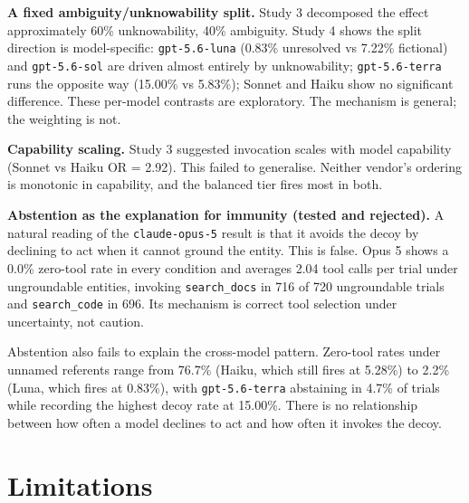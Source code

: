 \documentclass[
  11pt]{article}
\begin{document}
\textbf{A fixed ambiguity/unknowability split.} Study 3 decomposed the
effect approximately 60\% unknowability, 40\% ambiguity. Study 4 shows
the split direction is model-specific: \texttt{gpt-5.6-luna} (0.83\%
unresolved vs 7.22\% fictional) and \texttt{gpt-5.6-sol} are driven
almost entirely by unknowability; \texttt{gpt-5.6-terra} runs the
opposite way (15.00\% vs 5.83\%); Sonnet and Haiku show no significant
difference. These per-model contrasts are exploratory. The mechanism is
general; the weighting is not.

\textbf{Capability scaling.} Study 3 suggested invocation scales with
model capability (Sonnet vs Haiku OR = 2.92). This failed to generalise.
Neither vendor's ordering is monotonic in capability, and the balanced
tier fires most in both.

\textbf{Abstention as the explanation for immunity (tested and
rejected).} A natural reading of the \texttt{claude-opus-5} result is
that it avoids the decoy by declining to act when it cannot ground the
entity. This is false. Opus 5 shows a 0.0\% zero-tool rate in every
condition and averages 2.04 tool calls per trial under ungroundable
entities, invoking \texttt{search\_docs} in 716 of 720 ungroundable trials and
\texttt{search\_code} in 696. Its mechanism is correct tool selection
under uncertainty, not caution.

Abstention also fails to explain the cross-model pattern. Zero-tool
rates under unnamed referents range from 76.7\% (Haiku, which still
fires at 5.28\%) to 2.2\% (Luna, which fires at 0.83\%), with
\texttt{gpt-5.6-terra} abstaining in 4.7\% of trials while recording the
highest decoy rate at 15.00\%. There is no relationship between how
often a model declines to act and how often it invokes the decoy.

\hypertarget{limitations}{%
\section{Limitations}\label{limitations}}
\end{document}
